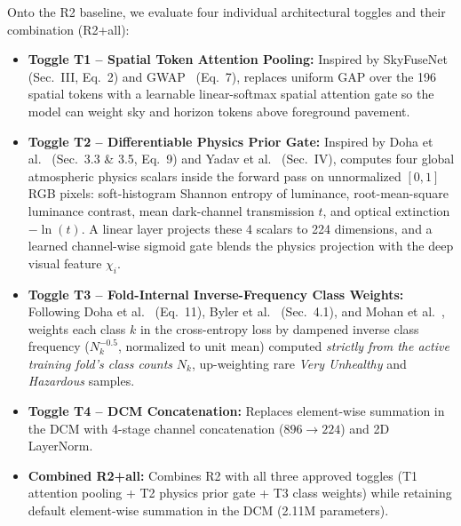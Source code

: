 \documentclass[conference]{IEEEtran}
\begin{document}
Onto the R2 baseline, we evaluate four individual architectural toggles and
their combination (R2+all):
\begin{itemize}
  \item \textbf{Toggle T1 -- Spatial Token Attention Pooling:} Inspired by
        SkyFuseNet~\cite{abdelsalamSkyFuseNetCrossAttentionSwin2026} (Sec.~III,
        Eq.~2) and GWAP~\cite{leeEnhancingPM25Detection2025} (Eq.~7), replaces
        uniform GAP over the 196 spatial tokens with a learnable linear-softmax
        spatial attention gate so the model can weight sky and horizon tokens
        above foreground pavement.
  \item \textbf{Toggle T2 -- Differentiable Physics Prior Gate:} Inspired by
        Doha et al.~\cite{dohaDeepMultiTaskLearning2026} (Sec.~3.3 \& 3.5,
        Eq.~9) and Yadav et al.~\cite{yadavRoadsideTreeImageBased2025}
        (Sec.~IV), computes four global atmospheric physics scalars inside the
        forward pass on unnormalized $[0,1]$ RGB pixels: soft-histogram Shannon
        entropy of luminance, root-mean-square luminance contrast, mean
        dark-channel transmission $t$, and optical extinction $-\ln(t)$. A
        linear layer projects these 4 scalars to 224 dimensions, and a learned
        channel-wise sigmoid gate blends the physics projection with the deep
        visual feature $\chi_i$.
  \item \textbf{Toggle T3 -- Fold-Internal Inverse-Frequency Class Weights:}
        Following Doha et al.~\cite{dohaDeepMultiTaskLearning2026} (Eq.~11),
        Byler et al.~\cite{bylerLocationGeneralizabilityImageBased2025}
        (Sec.~4.1), and Mohan et al.~\cite{mohanDeepLearningBasedPM252025},
        weights each class $k$ in the cross-entropy loss by dampened inverse
        class frequency ($N_k^{-0.5}$, normalized to unit mean) computed
        \textit{strictly from the active training fold's class counts} $N_k$,
        up-weighting rare \textit{Very Unhealthy} and \textit{Hazardous}
        samples.
  \item \textbf{Toggle T4 -- DCM Concatenation:} Replaces element-wise summation
        in the DCM with 4-stage channel concatenation ($896 \to 224$) and 2D
        LayerNorm.
  \item \textbf{Combined R2+all:} Combines R2 with all three approved toggles
        (T1 attention pooling + T2 physics prior gate + T3 class weights) while
        retaining default element-wise summation in the DCM (2.11M parameters).
\end{itemize}
\end{document}

